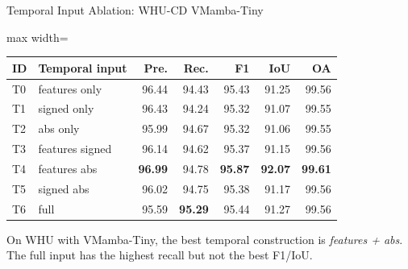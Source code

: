 \begin{frame}{Temporal Input Ablation: WHU-CD VMamba-Tiny}
    \centering
    \scriptsize
    \begin{adjustbox}{max width=\textwidth}
    \begin{tabular}{llrrrrr}
        \toprule
        \textbf{ID} & \textbf{Temporal input} & \textbf{Pre.} & \textbf{Rec.} & \textbf{F1} & \textbf{IoU} & \textbf{OA} \\
        \midrule
        T0 & features only & 96.44 & 94.43 & 95.43 & 91.25 & 99.56 \\
        T1 & signed only & 96.43 & 94.24 & 95.32 & 91.07 & 99.55 \\
        T2 & abs only & 95.99 & 94.67 & 95.32 & 91.06 & 99.55 \\
        T3 & features signed & 96.14 & 94.62 & 95.37 & 91.15 & 99.56 \\
        T4 & features abs & \textbf{96.99} & 94.78 & \textbf{95.87} & \textbf{92.07} & \textbf{99.61} \\
        T5 & signed abs & 96.02 & 94.75 & 95.38 & 91.17 & 99.56 \\
        T6 & full & 95.59 & \textbf{95.29} & 95.44 & 91.27 & 99.56 \\
        \bottomrule
    \end{tabular}
    \end{adjustbox}

    \vspace{0.5em}
    \small
    On WHU with VMamba-Tiny, the best temporal construction is \emph{features + abs}. The full input has the highest recall but not the best F1/IoU.
\end{frame}

